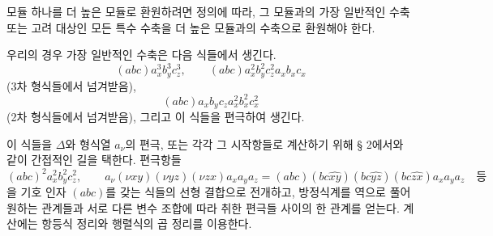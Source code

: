 
모듈 하나를 더 높은 모듈로 환원하려면 정의에 따라, 그 모듈과의 가장 일반적인 수축 또는 고려 대상인 모든 특수 수축을 더 높은 모듈과의 수축으로 환원해야 한다.

우리의 경우 가장 일반적인 수축은 다음 식들에서 생긴다.
\[
(abc)a_x^3b_y^3c_z^3,
\qquad
(abc)a_x^2b_y^2c_z^2a_xb_xc_x
\]
(3차 형식들에서 넘겨받음),
\[
(abc)a_xb_yc_za_x^2b_x^2c_x^2
\]
(2차 형식들에서 넘겨받음), 그리고 이 식들을 편극하여 생긴다.

이 식들을 $\Delta$와 형식열 $a_\nu$의 편극, 또는 각각 그 시작항들로 계산하기 위해 § 2에서와 같이 간접적인 길을 택한다. 편극항들
\[
(abc)^2a_x^2b_y^2c_z^2,
\qquad
 a_\nu(\nu xy)(\nu yz)(\nu zx)a_xa_ya_z=(abc)(bc\widehat{xy})(bc\widehat{yz})(bc\widehat{zx})a_xa_ya_z\quad\text{등}
\]
을 기호 인자 $(abc)$를 갖는 식들의 선형 결합으로 전개하고, 방정식계를 역으로 풀어 원하는 관계들과 서로 다른 변수 조합에 따라 취한 편극들 사이의 한 관계를 얻는다. 계산에는 항등식 정리와 행렬식의 곱 정리를 이용한다.
